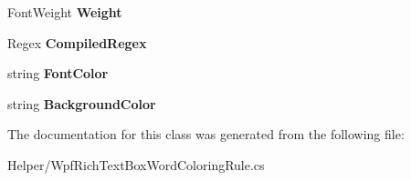 \begin{DoxyCompactItemize}
\item 
Font\+Weight {\bfseries Weight}\hypertarget{class_power_system_planning_wpf_app_1_1_helper_1_1_wpf_rich_text_box_word_coloring_rule_a0e3994f1b167f708211e73c15e4392ab}{}\label{class_power_system_planning_wpf_app_1_1_helper_1_1_wpf_rich_text_box_word_coloring_rule_a0e3994f1b167f708211e73c15e4392ab}

\item 
Regex {\bfseries Compiled\+Regex}\hypertarget{class_power_system_planning_wpf_app_1_1_helper_1_1_wpf_rich_text_box_word_coloring_rule_a2704d15e4f84518b1db231c27778feeb}{}\label{class_power_system_planning_wpf_app_1_1_helper_1_1_wpf_rich_text_box_word_coloring_rule_a2704d15e4f84518b1db231c27778feeb}

\item 
string {\bfseries Font\+Color}\hypertarget{class_power_system_planning_wpf_app_1_1_helper_1_1_wpf_rich_text_box_word_coloring_rule_a0ed8792f2bfcf32484a6d5cbebdd601f}{}\label{class_power_system_planning_wpf_app_1_1_helper_1_1_wpf_rich_text_box_word_coloring_rule_a0ed8792f2bfcf32484a6d5cbebdd601f}

\item 
string {\bfseries Background\+Color}\hypertarget{class_power_system_planning_wpf_app_1_1_helper_1_1_wpf_rich_text_box_word_coloring_rule_a5f01cf42d5bc69ba40eb635fd9cf8c2b}{}\label{class_power_system_planning_wpf_app_1_1_helper_1_1_wpf_rich_text_box_word_coloring_rule_a5f01cf42d5bc69ba40eb635fd9cf8c2b}

\end{DoxyCompactItemize}


The documentation for this class was generated from the following file\+:\begin{DoxyCompactItemize}
\item 
Helper/Wpf\+Rich\+Text\+Box\+Word\+Coloring\+Rule.\+cs\end{DoxyCompactItemize}
